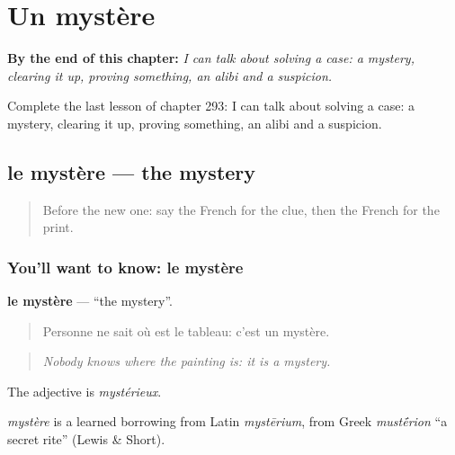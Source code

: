 
\chapter{Un mystère}
\label{ch:fr-un-mystere}

\begin{chapteropening}
\textbf{By the end of this chapter:} \emph{I can talk about solving a case: a mystery, clearing it up, proving something, an alibi and a suspicion.}

Complete the last lesson of chapter 293: I can talk about solving a case: a mystery, clearing it up, proving something, an alibi and a suspicion.
\end{chapteropening}

\section[le mystère]{le mystère — the mystery}

\label{lesson:FR-C293-mystere}



\begin{quote}
Before the new one: say the French for the clue, then the French for the print.
\end{quote}

\subsection*{You'll want to know: le mystère}
\textbf{le mystère} — \textquotedblleft{}the mystery\textquotedblright{}.

\begin{quote}
Personne ne sait où est le tableau: c'est un mystère.
\end{quote}

\begin{quote}
\emph{Nobody knows where the painting is: it is a mystery.}
\end{quote}

The adjective is \emph{mystérieux}.

\begin{cousinweb}
\emph{mystère} is a learned borrowing from Latin \emph{mystērium}, from Greek \emph{must\'{\={e}}rion} \textquotedblleft{}a secret rite\textquotedblright{} (Lewis \& Short).
\end{cousinweb}

